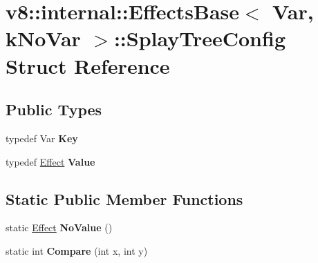 \hypertarget{structv8_1_1internal_1_1_effects_base_1_1_splay_tree_config}{}\section{v8\+:\+:internal\+:\+:Effects\+Base$<$ Var, k\+No\+Var $>$\+:\+:Splay\+Tree\+Config Struct Reference}
\label{structv8_1_1internal_1_1_effects_base_1_1_splay_tree_config}
\subsection*{Public Types}
\begin{DoxyCompactItemize}
\item 
typedef Var {\bfseries Key}\hypertarget{structv8_1_1internal_1_1_effects_base_1_1_splay_tree_config_a9af7d9d843c8668b00eff3c0863bf6b0}{}\label{structv8_1_1internal_1_1_effects_base_1_1_splay_tree_config_a9af7d9d843c8668b00eff3c0863bf6b0}

\item 
typedef \hyperlink{structv8_1_1internal_1_1_effect}{Effect} {\bfseries Value}\hypertarget{structv8_1_1internal_1_1_effects_base_1_1_splay_tree_config_a787e06f43d5b4d054387fb7023f41f59}{}\label{structv8_1_1internal_1_1_effects_base_1_1_splay_tree_config_a787e06f43d5b4d054387fb7023f41f59}

\end{DoxyCompactItemize}
\subsection*{Static Public Member Functions}
\begin{DoxyCompactItemize}
\item 
static \hyperlink{structv8_1_1internal_1_1_effect}{Effect} {\bfseries No\+Value} ()\hypertarget{structv8_1_1internal_1_1_effects_base_1_1_splay_tree_config_af332490adbbf3cc4863fe2169a5be737}{}\label{structv8_1_1internal_1_1_effects_base_1_1_splay_tree_config_af332490adbbf3cc4863fe2169a5be737}

\item 
static int {\bfseries Compare} (int x, int y)\hypertarget{structv8_1_1internal_1_1_effects_base_1_1_splay_tree_config_adb6d0e340408959906188d447ae92a1d}{}\label{structv8_1_1internal_1_1_effects_base_1_1_splay_tree_config_adb6d0e340408959906188d447ae92a1d}

\end{DoxyCompactItemize}
